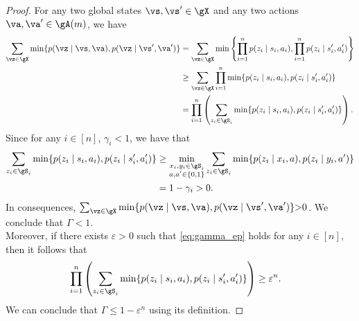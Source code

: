 \begin{proof}
    For any two global states $\vs,\vs'\in\gX$ and any two actions $\va,\va'\in\gA(m)$, we have
    \begin{align*}
        \sum_{\vz\in\gX} \min\{p(\vz \mid \vs, \va), p(\vz \mid \vs', \va')\}
        &= \sum_{\vz\in\gX} \min\left\{\prod_{i=1}^np(z_i \mid s_i, a_i), \prod_{i=1}^np(z_i \mid s'_i, a'_i)\right\} \\
        &\ge \sum_{\vz\in\gX}\prod_{i=1}^n \min\{p(z_i \mid s_i, a_i), p(z_i \mid s'_i, a'_i)\} \\
        &= \prod_{i=1}^n \left(\sum_{z_i\in\gS_i} \min\{p(z_i \mid s_i, a_i), p(z_i \mid s'_i, a'_i)\}\right).
    \end{align*}
    Since for any $i\in[n]$, $\gamma_i<1$, we have that
    \begin{align*}
        \sum_{z_i\in\gS_i} \min\{p(z_i \mid s_i, a_i), p(z_i \mid s'_i, a'_i)\}
        &\ge \min_{\substack{x_i,y_i\in\gS_i \\a,a'\in\{0,1\}}} \sum_{z_i\in\gS_i} \min\{p(z_i \mid x_i, a), p(z_i \mid y_i, a')\} \\
        &= 1-\gamma_i >0.
    \end{align*}
    In consequences, ${\sum_{\vz\in\gX} \min\{p(\vz \mid \vs, \va), p(\vz \mid \vs', \va')\}{>}0}$.
    We conclude that $\Gamma{<}1$.\\
    Moreover, if there exists $\varepsilon>0$ such that \eqref{eq:gamma_ep} holds for any $i\in[n]$, then it follows that
    \begin{align*}
        \prod_{i=1}^n \left(\sum_{z_i\in\gS_i} \min\{p(z_i \mid s_i, a_i), p(z_i \mid s'_i, a'_i)\}\right)
        &\ge \varepsilon^n.
    \end{align*}
    We can conclude that $\Gamma\le 1-\varepsilon^n$ using its definition.
\end{proof}



